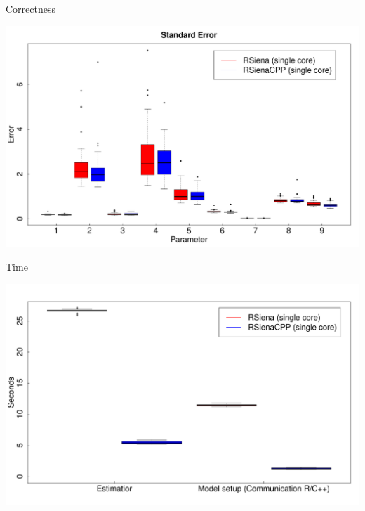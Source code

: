 \documentclass[]{beamer}                                                %
\begin{document}
\begin{frame}{Correctness}                                              %
  \begin{center}
    \includegraphics[width=\textwidth]{error}
  \end{center}
\end{frame}
\begin{frame}{Time}                                                     %
  \begin{center}
    \includegraphics[width=\textwidth]{estimation}
  \end{center}
\end{frame}
\end{document}
